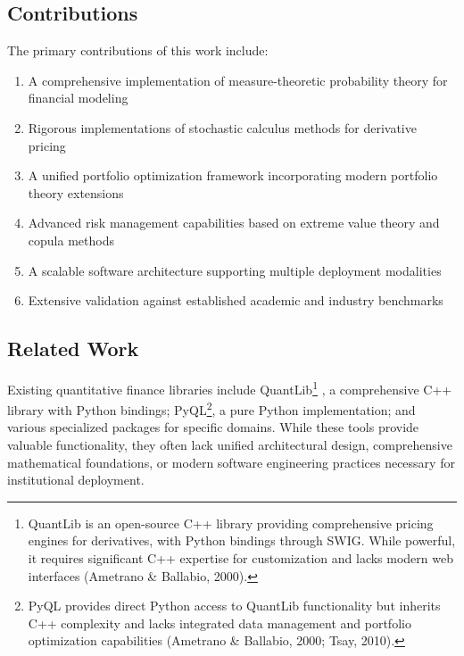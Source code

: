 \documentclass[12pt,a4paper]{article}
\theoremstyle{definition}
\theoremstyle{remark}
\begin{document}
\subsection{Contributions}

The primary contributions of this work include:

\begin{enumerate}
    \item A comprehensive implementation of measure-theoretic probability theory for financial modeling \citep{shreve2004stochastic}
    \item Rigorous implementations of stochastic calculus methods for derivative pricing \citep{black1973pricing, heston1993closed}
    \item A unified portfolio optimization framework incorporating modern portfolio theory extensions \citep{markowitz1952}
    \item Advanced risk management capabilities based on extreme value theory and copula methods \citep{jorion2007value, mcneil2015quantitative}
    \item A scalable software architecture supporting multiple deployment modalities
    \item Extensive validation against established academic and industry benchmarks \citep{hull2018options}
\end{enumerate}

\subsection{Related Work}

Existing quantitative finance libraries include QuantLib\footnote{QuantLib is an open-source C++ library providing comprehensive pricing engines for derivatives, with Python bindings through SWIG. While powerful, it requires significant C++ expertise for customization and lacks modern web interfaces (Ametrano \& Ballabio, 2000).} \citep{quantlib2000}, a comprehensive C++ library with Python bindings; PyQL\footnote{PyQL provides direct Python access to QuantLib functionality but inherits C++ complexity and lacks integrated data management and portfolio optimization capabilities (Ametrano \& Ballabio, 2000; Tsay, 2010).}, a pure Python implementation; and various specialized packages for specific domains. While these tools provide valuable functionality, they often lack unified architectural design, comprehensive mathematical foundations, or modern software engineering practices necessary for institutional deployment.
\end{document}
